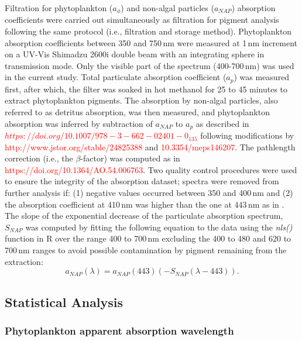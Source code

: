 \documentclass[utf8]{frontiersSCNS} %
\begin{document}
Filtration for phytoplankton ($a_\phi$) and non-algal particles ($a_{NAP}$) absorption coefficients were carried out simultaneously as filtration for pigment analysis following the same protocol (i.e., filtration and storage method). Phytoplankton absorption coefficients between 350 and 750\,nm were measured at 1\,nm increment on a UV-Vis Shimadzu 2600i double beam with an integrating sphere in transmission mode. Only the visible part of the spectrum (400-700\,nm) was used in the current study. Total particulate absorption coefficient ($a_p$) was measured first, after which, the filter was soaked in hot methanol for 25 to 45 minutes to extract phytoplankton pigments. The absorption by non-algal particles, also referred to as detritus absorption, was then measured, and phytoplankton absorption was inferred by subtraction of $a_{NAP}$ to $a_p$ as described in \cite{mitchell1984} \textcolor{red}{$https://doi.org/10.1007/978-3-662-02401-0_135$} following modifications by \cite{Hoepffner1991}\textcolor{red}{http://www.jstor.org/stable/24825388} and \cite{Kyewalyanga1997} \textcolor{red}{10.3354/meps146207}. The pathlength correction (i.e., the $\beta$-factor) was computed as in \cite{Stramski2015}\textcolor{red}{ https://doi.org/10.1364/AO.54.006763}. Two quality control procedures were used to ensure the integrity of the absorption dataset; spectra were removed from further analysis if: (1) negative values occurred between 350 and 400\,nm and (2) the absorption coefficient at 410\,nm was higher than the one at 443\,nm as in \cite{devred2006}. The slope of the exponential decrease of the particulate absorption spectrum, $S_{NAP}$ was computed by fitting the following equation to the data using the \textit{nls()} function in R over the range 400 to 700\,nm excluding the 400 to 480 and 620 to 700\,nm ranges to avoid possible contamination by pigment remaining from the extraction:
\begin{equation}
a_{NAP}(\lambda) = a_{NAP}(443) (-S_{NAP} (\lambda - 443)).
\end{equation}

\subsection{Statistical Analysis}

\subsubsection{Phytoplankton apparent absorption wavelength}\label{paaw}
\end{document}
